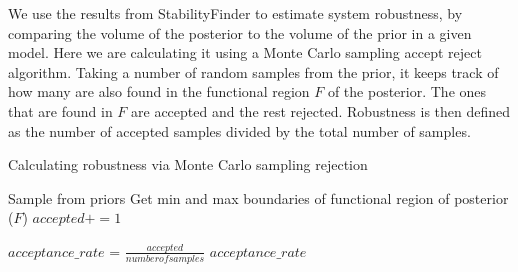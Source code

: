 We use the results from StabilityFinder to estimate system robustness, by comparing the volume of the posterior to the volume of the prior in a given model. Here we are calculating it using a Monte Carlo sampling accept reject algorithm. Taking a number of random samples from the prior, it keeps track of how many are also found in the functional region $F$ of the posterior. The ones that are found in $F$ are accepted and the rest rejected. Robustness is then defined as the number of accepted samples divided by the total number of samples.
\begin{algorithm}[ht]
	\label{alg:robustness}
  \caption{Calculating robustness via Monte Carlo sampling rejection }
 \begin{algorithmic}[1]
    \Statex
    \State Sample from priors 
    \State Get min and max boundaries of functional region of posterior ($F$)
    	\State $accepted += 1$
    \EndIf
    	    	
    \State $acceptance\_rate$ = $\frac{accep
    	ted}{number of samples}$
    \State \Return $acceptance\_rate$
    
  \end{algorithmic}

\end{algorithm}

\newpage






